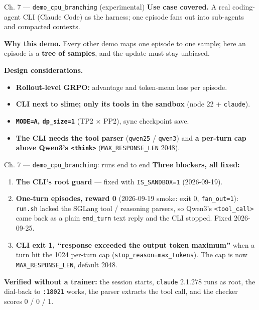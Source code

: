 \documentclass[
  10pt,
  ignorenonframetext,
  aspectratio=169,
  t]{beamer}
\providecommand{\tightlist}{%
  \setlength{\itemsep}{0pt}\setlength{\parskip}{0pt}}
\begin{document}
\begin{frame}{Ch. 7 --- \texttt{demo\_cpu\_branching}
(experimental)}
\protect\hypertarget{ch.-7-demo_cpu_branching-experimental}{}
\textbf{Use case covered.} A real coding-agent CLI (Claude Code) as the
harness; one episode fans out into sub-agents and compacted contexts.

\textbf{Why this demo.} Every other demo maps one episode to one sample;
here an episode is a \textbf{tree of samples}, and the update must stay
unbiased.

\textbf{Design considerations.}

\begin{itemize}
\tightlist
\item
  \textbf{Rollout-level GRPO:} advantage and token-mean loss per
  episode.
\item
  \textbf{CLI next to slime; only its tools in the sandbox} (node 22 +
  \texttt{claude}).
\item
  \textbf{\texttt{MODE=A}, \texttt{dp\_size=1}} (TP2 × PP2), sync
  checkpoint save.
\item
  \textbf{The CLI needs the tool parser} (\texttt{qwen25} /
  \texttt{qwen3}) and \textbf{a per-turn cap above Qwen3's
  \texttt{\textless{}think\textgreater{}}} (\texttt{MAX\_RESPONSE\_LEN}
  2048).
\end{itemize}
\end{frame}

\begin{frame}{Ch. 7 --- \texttt{demo\_cpu\_branching}: runs end
to end}
\protect\hypertarget{ch.-7-demo_cpu_branching-runs-end-to-end}{}
\textbf{Three blockers, all fixed:}

\begin{enumerate}
\tightlist
\item
  \textbf{The CLI's root guard} --- fixed with \texttt{IS\_SANDBOX=1}
  (2026-09-19).
\item
  \textbf{One-turn episodes, reward 0} (2026-09-19 smoke: exit 0,
  \texttt{fan\_out=1}): \texttt{run.sh} lacked the SGLang tool /
  reasoning parsers, so Qwen3's
  \texttt{\textless{}tool\_call\textgreater{}} came back as a plain
  \texttt{end\_turn} text reply and the CLI stopped. Fixed 2026-09-25.
\item
  \textbf{CLI exit 1, ``response exceeded the output token maximum''}
  when a turn hit the 1024 per-turn cap
  (\texttt{stop\_reason=max\_tokens}). The cap is now
  \texttt{MAX\_RESPONSE\_LEN}, default 2048.
\end{enumerate}

\textbf{Verified without a trainer:} the session starts, \texttt{claude}
2.1.278 runs as root, the dial-back to \texttt{:18021} works, the parser
extracts the tool call, and the checker scores 0 / 0 / 1.
\end{frame}
\end{document}
